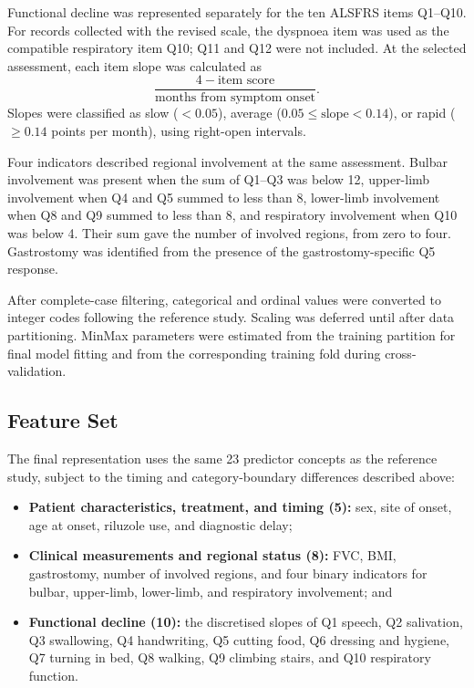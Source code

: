 Functional decline was represented separately for the ten ALSFRS items Q1--Q10. For records collected with the revised scale, the dyspnoea item was used as the compatible respiratory item Q10; Q11 and Q12 were not included. At the selected assessment, each item slope was calculated as
\[
  \frac{4 - \text{item score}}{\text{months from symptom onset}}.
\]
Slopes were classified as slow ($<0.05$), average ($0.05\leq\text{slope}<0.14$), or rapid ($\geq0.14$ points per month), using right-open intervals.

Four indicators described regional involvement at the same assessment. Bulbar involvement was present when the sum of Q1--Q3 was below 12, upper-limb involvement when Q4 and Q5 summed to less than 8, lower-limb involvement when Q8 and Q9 summed to less than 8, and respiratory involvement when Q10 was below 4. Their sum gave the number of involved regions, from zero to four. Gastrostomy was identified from the presence of the gastrostomy-specific Q5 response.

After complete-case filtering, categorical and ordinal values were converted to integer codes following the reference study. Scaling was deferred until after data partitioning. MinMax parameters were estimated from the training partition for final model fitting and from the corresponding training fold during cross-validation.

\subsection{Feature Set}
\label{subsec:s2_featureset}

The final representation uses the same 23 predictor concepts as the reference study, subject to the timing and category-boundary differences described above:

\begin{itemize}
  \item \textbf{Patient characteristics, treatment, and timing (5):} sex, site of onset, age at onset, riluzole use, and diagnostic delay;
  \item \textbf{Clinical measurements and regional status (8):} FVC, BMI, gastrostomy, number of involved regions, and four binary indicators for bulbar, upper-limb, lower-limb, and respiratory involvement; and
  \item \textbf{Functional decline (10):} the discretised slopes of Q1 speech, Q2 salivation, Q3 swallowing, Q4 handwriting, Q5 cutting food, Q6 dressing and hygiene, Q7 turning in bed, Q8 walking, Q9 climbing stairs, and Q10 respiratory function.
\end{itemize}

